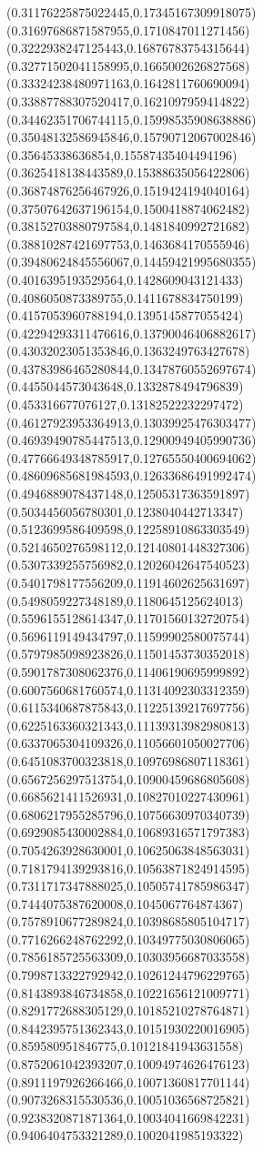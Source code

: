 {(0.31176225875022445,0.17345167309918075)
(0.31697686871587955,0.1710847011271456)
(0.3222938247125443,0.16876783754315644)
(0.32771502041158995,0.1665002626827568)
(0.33324238480971163,0.1642811760690094)
(0.33887788307520417,0.1621097959414822)
(0.34462351706744115,0.15998535908638886)
(0.35048132586945846,0.15790712067002846)
(0.35645338636854,0.15587435404494196)
(0.3625418138443589,0.15388635056422806)
(0.36874876256467926,0.1519424194040164)
(0.37507642637196154,0.1500418874062482)
(0.38152703880797584,0.1481840992721682)
(0.38810287421697753,0.1463684170555946)
(0.39480624845556067,0.14459421995680355)
(0.4016395193529564,0.1428609043121433)
(0.4086050873389755,0.1411678834750199)
(0.4157053960788194,0.1395145877055424)
(0.42294293311476616,0.13790046406882617)
(0.43032023051353846,0.1363249763427678)
(0.43783986465280844,0.13478760552697674)
(0.4455044573043648,0.1332878494796839)
(0.453316677076127,0.13182522232297472)
(0.46127923953364913,0.13039925476303477)
(0.46939490785447513,0.12900949405990736)
(0.47766649348785917,0.12765550400694062)
(0.48609685681984593,0.12633686491992474)
(0.4946889078437148,0.12505317363591897)
(0.5034456056780301,0.1238040442713347)
(0.5123699586409598,0.12258910863303549)
(0.5214650276598112,0.12140801448327306)
(0.5307339255756982,0.12026042647540523)
(0.5401798177556209,0.11914602625631697)
(0.5498059227348189,0.1180645125624013)
(0.5596155128614347,0.11701560132720754)
(0.5696119149434797,0.11599902580075744)
(0.5797985098923826,0.11501453730352018)
(0.5901787308062376,0.11406190695999892)
(0.6007560681760574,0.11314092303312359)
(0.6115340687875843,0.11225139217697756)
(0.6225163360321343,0.11139313982980813)
(0.6337065304109326,0.11056601050027706)
(0.6451083700323818,0.10976986807118361)
(0.6567256297513754,0.10900459686805608)
(0.6685621411526931,0.10827010227430961)
(0.6806217955285796,0.10756630970340739)
(0.6929085430002884,0.10689316571797383)
(0.7054263928630001,0.10625063848563031)
(0.7181794139293816,0.10563871824914595)
(0.7311717347888025,0.10505741785986347)
(0.7444075387620008,0.1045067764874367)
(0.7578910677289824,0.10398685805104717)
(0.7716266248762292,0.10349775030806065)
(0.7856185725563309,0.10303956687033558)
(0.7998713322792942,0.10261244796229765)
(0.8143893846734858,0.10221656121009771)
(0.8291772688305129,0.10185210278764871)
(0.8442395751362343,0.10151930220016905)
(0.859580951846775,0.10121841943631558)
(0.8752061042393207,0.10094974626476123)
(0.8911197926266466,0.10071360817701144)
(0.9073268315530536,0.10051036568725821)
(0.9238320871871364,0.10034041669842231)
(0.9406404753321289,0.1002041985193322)
}
